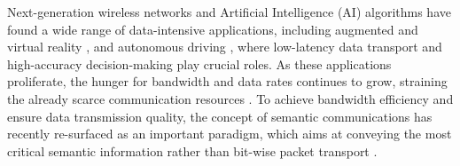 
%

Next-generation wireless networks and Artificial Intelligence (AI) algorithms have found 
a wide range of data-intensive applications, 
including augmented and virtual reality \cite{hazarika2023towards}, and autonomous driving \cite{chen2020vision}, where low-latency data transport
and high-accuracy decision-making play crucial roles. As these applications proliferate, the hunger for bandwidth and
data rates continues to grow, straining the already 
scarce communication resources \cite{strinati20216g}. To achieve bandwidth efficiency and ensure data transmission quality, the concept of semantic communications has recently 
re-surfaced as an important paradigm, which aims at conveying the most critical semantic information rather than bit-wise packet transport \cite{luo2022semantic}.

